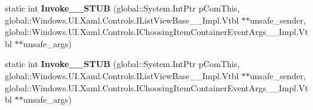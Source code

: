 \begin{DoxyCompactItemize}
\mbox{\label{struct_windows_1_1_foundation_1_1_typed_event_handler___a___windows___u_i___xaml___controls___li81aac31d5f7498ed4eec5cad5e67da4e_ada08b8879752135a4b1d10c1e7b46a18}} 
static int {\bfseries Invoke\+\_\+\+\_\+\+S\+T\+UB} (global\+::\+System.\+Int\+Ptr p\+Com\+This, global\+::\+Windows.\+U\+I.\+Xaml.\+Controls.\+I\+List\+View\+Base\+\_\+\+\_\+\+Impl.\+Vtbl $\ast$$\ast$unsafe\+\_\+sender, global\+::\+Windows.\+U\+I.\+Xaml.\+Controls.\+I\+Choosing\+Item\+Container\+Event\+Args\+\_\+\+\_\+\+Impl.\+Vtbl $\ast$$\ast$unsafe\+\_\+args)
\item 
\mbox{\label{struct_windows_1_1_foundation_1_1_typed_event_handler___a___windows___u_i___xaml___controls___li81aac31d5f7498ed4eec5cad5e67da4e_ada08b8879752135a4b1d10c1e7b46a18}} 
static int {\bfseries Invoke\+\_\+\+\_\+\+S\+T\+UB} (global\+::\+System.\+Int\+Ptr p\+Com\+This, global\+::\+Windows.\+U\+I.\+Xaml.\+Controls.\+I\+List\+View\+Base\+\_\+\+\_\+\+Impl.\+Vtbl $\ast$$\ast$unsafe\+\_\+sender, global\+::\+Windows.\+U\+I.\+Xaml.\+Controls.\+I\+Choosing\+Item\+Container\+Event\+Args\+\_\+\+\_\+\+Impl.\+Vtbl $\ast$$\ast$unsafe\+\_\+args)
\end{DoxyCompactItemize}
